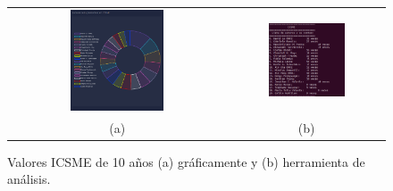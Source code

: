 \documentclass[a4paper, 12pt]{book}
\begin{document}
\begin{figure}[!h]
    \centering
    \begin{tabular}{cc}
    \includegraphics[width=0.45\textwidth]{img/icsme_10_year_graph.png} &  
    \includegraphics[width=0.52\textwidth]{img/icsme_10_year.png} \\ 
    (a) &(b) 
    \end{tabular}
    \caption{Valores ICSME de 10 años (a) gráficamente y (b) herramienta de análisis.}
    \label{fig:comp_icsme_10_year}
\end{figure}
\end{document}
